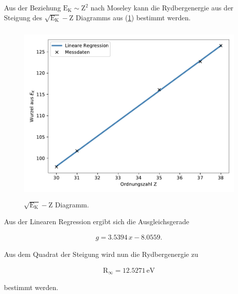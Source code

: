 \noindent
Aus der Beziehung $\text{E}_\text{K} \sim \text{Z}^2$ nach Moseley
 kann die Rydbergenergie aus der Steigung des $ \sqrt{\text{E}_\text{K}}-\text{Z}$ Diagramms aus (\ref{fig:mose}) bestimmt werden.

\begin{figure}
    \centering
       \includegraphics[height=9cm]{daten/mose.pdf}
       \caption{$\sqrt{\text{E}_\text{K}}-\text{Z}$ Diagramm.}
       \label{fig:mose}
\end{figure}

\noindent
Aus der Linearen Regression ergibt sich die Ausgleichsgerade

\begin{align*}
    g=3.5394\, x -8.0559.
\end{align*}

\noindent
Aus dem Quadrat der Steigung wird nun die Rydbergenergie zu 

\begin{align*}
    \text{R}_\infty =12.5271 \, \mathrm{eV}
\end{align*}

\noindent
bestimmt werden.

